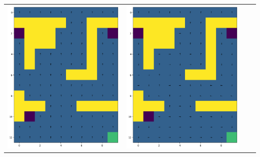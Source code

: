 \begin{landscape}
\begin{center}
\begin{tabular}{c || c  c  c}
            \includegraphics[width=0.35\textheight]{assets/dp/analysis/prob_0.25_gamma_0.2_policy.png}
        & 
            \includegraphics[width=0.35\textheight]{assets/dp/analysis/prob_0.5_gamma_0.2_policy.png}

\end{tabular}
\end{center}
\end{landscape}

